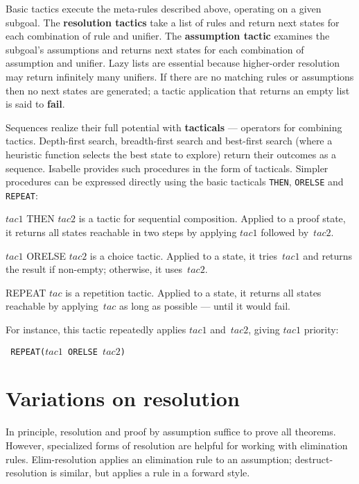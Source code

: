 Basic tactics execute the meta-rules described above, operating on a
given subgoal. The {\bf resolution tactics} take a list of rules and
return next states for each combination of rule and unifier. The {\bf
assumption tactic} examines the subgoal's assumptions and returns next
states for each combination of assumption and unifier. Lazy lists are
essential because higher-order resolution may return infinitely many
unifiers. If there are no matching rules or assumptions then no next
states are generated; a tactic application that returns an empty list is
said to {\bf fail}.

Sequences realize their full potential with {\bf tacticals} --- operators
for combining tactics. Depth-first search, breadth-first search and
best-first search (where a heuristic function selects the best state to
explore) return their outcomes as a sequence. Isabelle provides such
procedures in the form of tacticals. Simpler procedures can be expressed
directly using the basic tacticals {\tt THEN}, {\tt ORELSE} and {\tt REPEAT}:
\begin{ttdescription}
    \item[$tac1$ THEN $tac2$] is a tactic for sequential composition. Applied
    to a proof state, it returns all states reachable in two steps by applying
    $tac1$ followed by~$tac2$.

    \item[$tac1$ ORELSE $tac2$] is a choice tactic. Applied to a state, it
    tries~$tac1$ and returns the result if non-empty; otherwise, it uses~$tac2$.

    \item[REPEAT $tac$] is a repetition tactic. Applied to a state, it
    returns all states reachable by applying~$tac$ as long as possible --- until
    it would fail.
\end{ttdescription}
For instance, this tactic repeatedly applies $tac1$ and~$tac2$, giving
$tac1$ priority:
\begin{center}
    \tt
    REPEAT($tac1$ ORELSE $tac2$)
\end{center}


\section{Variations on resolution}
In principle, resolution and proof by assumption suffice to prove all
theorems. However, specialized forms of resolution are helpful for working
with elimination rules. Elim-resolution applies an elimination rule to an
assumption; destruct-resolution is similar, but applies a rule in a forward
style.

